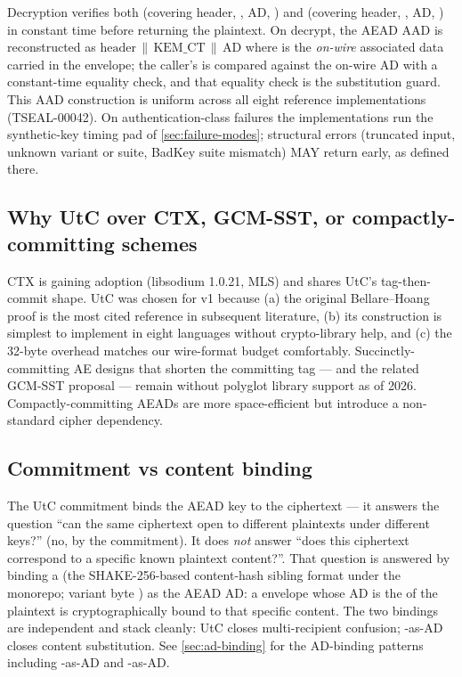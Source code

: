 Decryption verifies both  (covering header, , AD, ) and  (covering header, , AD, ) in constant time before returning the plaintext. On decrypt, the AEAD AAD is reconstructed as $\mathrm{header} \,\|\, \mathrm{KEM\_CT} \,\|\, \mathrm{AD}$ where  is the \emph{on-wire} associated data carried in the envelope; the caller's  is compared against the on-wire AD with a constant-time equality check, and that equality check is the substitution guard. This AAD construction is uniform across all eight reference implementations (TSEAL-00042). On authentication-class failures the implementations run the synthetic-key timing pad of \cref{sec:failure-modes}; structural errors (truncated input, unknown variant or suite, BadKey suite mismatch) MAY return early, as defined there.

\subsection{Why UtC over CTX, GCM-SST, or compactly-committing schemes}

CTX \citep{chan2022commit} is gaining adoption (libsodium 1.0.21, MLS) and shares UtC's tag-then-commit shape. UtC was chosen for v1 because (a) the original Bellare--Hoang proof is the most cited reference in subsequent literature, (b) its construction is simplest to implement in eight languages without crypto-library help, and (c) the 32-byte overhead matches our wire-format budget comfortably. Succinctly-committing AE designs that shorten the committing tag \citep{bellare2024succinct} --- and the related GCM-SST proposal --- remain without polyglot library support as of 2026. Compactly-committing AEADs \citep{grubbs2017aead} are more space-efficient but introduce a non-standard cipher dependency.

\subsection{Commitment vs content binding}

The UtC commitment binds the AEAD key to the ciphertext --- it answers the question ``can the same ciphertext open to different plaintexts under different keys?'' (no, by the commitment). It does \emph{not} answer ``does this ciphertext correspond to a specific known plaintext content?''. That question is answered by binding a \pqhash{} (the SHAKE-256-based content-hash sibling format under the \pqtoolkit{} monorepo; variant byte ) as the AEAD AD: a \pqcrypt{} envelope whose AD is the \pqhash{} of the plaintext is cryptographically bound to that specific content. The two bindings are independent and stack cleanly: UtC closes multi-recipient confusion; \pqhash{}-as-AD closes content substitution. See \cref{sec:ad-binding} for the AD-binding patterns including \pqid{}-as-AD and \pqhash{}-as-AD.
